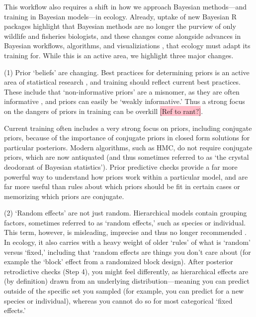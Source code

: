 \documentclass[11pt]{article}
\begin{document}
{This workflow also requires a shift in how we approach Bayesian methods---and training in Bayesian models---in ecology. Already, uptake of new Bayesian \textsf{R} packages highlight that Bayesian methods are no longer the purview of only wildlife and fisheries biologists, and these changes come alongside advances in Bayesian workflows, algorithms, and visualiziations \citep[e.g.][]{betanworkflow,vandeschoot2021,gabryvis}, that ecology must adapt its training for. While this is an active area, we highlight three major changes.

(1) Prior `beliefs' are changing. Best practices for determining priors is an active area of statistical research \citep{BDA,regotherstories}, and training should reflect current best practices. These include that `non-informative priors' are a misnomer, as they are often informative  \citep{lemoine2019}, and priors can easily be `weakly informative.' Thus a strong focus on the dangers of priors in training can be overkill \colorbox{pink}{[Ref to rant?]}. 

Current training often includes a very strong focus on priors, including conjugate priors, because of the importance of conjugate priors in closed form solutions for particular posteriors. Modern algorithms, such as HMC, do not require conjugate priors, which are now antiquated (and thus sometimes referred to as  `the crystal deodorant of Bayesian statistics'). Prior predictive checks provide a far more powerful way to understand how priors work within a particular model, and are far more useful than rules about which priors should be fit in certain cases or memorizing which priors are conjugate. 

(2) `Random effects' are not just random. Hierarchical models contain grouping factors, sometimes referred to as `random effects,' such as species or individual. This term, however, is misleading, imprecise and thus no longer recommended \citep{gelmanhill}. In ecology, it also carries with a heavy weight of older `rules' of what is `random' versus `fixed,' including that `random effects are things you don't care about (for example the `block' effect from a randomized block design). After posterior retrodictive checks (Step 4), you might feel differently, as hierarchical effects are (by definition) drawn from an underlying distribution---meaning you can predict outside of the specific set you sampled (for example, you can predict for a new species or individual), whereas you cannot do so for most categorical `fixed effects.'  

}
\end{document}
